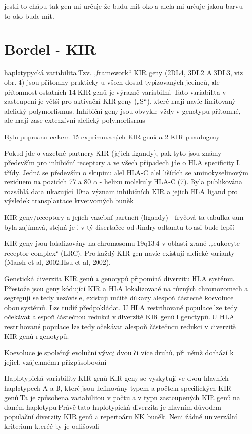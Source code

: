 \documentclass[czech,DP]{thesiskiv}
\begin{document}
jestli to chápu tak gen mi určuje že budu mít oko a alela mi určuje jakou barvu to oko bude mít.

\section{Bordel - KIR}

haplotypycká variabilita
Tzv. „framework“ KIR geny (2DL4, 3DL2 A 3DL3, viz obr. 4)
jsou přítomny prakticky u všech dosud typizovaných jedinců, ale přítomnost ostatních 14 KIR
genů je výrazně variabilní. Tato variabilita v zastoupení je větší pro aktivační KIR geny („S“),
které mají navíc limitovaný alelický polymorfismus. Inhibiční geny jsou obvykle vždy
v genotypu přítomné, ale mají zase extenzívní alelický polymorfismus

Bylo poprsáno celkem 15 exprimovaných KIR genů a 2 KIR pseudogeny


Pokud jde o vazebné partnery KIR (jejich ligandy), pak tyto jsou
známy především pro inhibiční receptory a ve všech případech jde o
HLA specificity I. třídy. Jedná se především o skupinu alel HLA-C alel
lišících se aminokyselinovým 
reziduem na pozicích
 77 a 80 $\alpha$
- helixu molekuly HLA-C (7). Byla publikována rozsáhlá data ukazující
10na význam inhibičních KIR a jejich HLA ligand pro výsledek
transplantace krvetvorných buněk

KIR geny/receptory a jejich vazební partneři (ligandy)
- fryčová ta tabulka tam byla zajímavá, stejná je i v tý disertačce od Jindry odtamtu to asi bude lepší


KIR geny jsou lokalizovány na chromosomu 19q13.4 v oblasti zvané „leukocyte receptor
complex“ (LRC). Pro každý KIR gen navíc existují alelické varianty (Marsh et al, 2002;Hsu
et al, 2002).

Genetická diverzita KIR genů a genotypů připomíná diverzitu HLA
systému. Přestože jsou geny kódující KIR a HLA lokalizované na
různých chromozomech a segregují se tedy nezávisle, existují určité
důkazy alespoň částečné koevoluce obou systémů. Lze tudíž
předpokládat. U HLA restrihované populace lze tedy očekávat
alespoň částečnou redukci v diverzitě KIR genů i genotypů.
U HLA restrihované populace lze tedy očekávat
alespoň částečnou redukci v diverzitě KIR genů i genotypů.

Koevoluce je společný evoluční vývoj dvou či více druhů, při němž dochází k jejich vzájemnému přizpůsobování

Haplotypická variability KIR genů
KIR geny se vyskytují ve dvou hlavních haplotypech A a B, které jsou definovány typem a počtem specifických KIR genů.Ta je způsobena variabilitou v počtu a v typu
zastoupených KIR genů na daném haplotypu
Právě tato
haplotypická diverzita je hlavním důvodem populační diverzity KIR
genů a repertoáru NK buněk.
Neni žádné univerzální kriterium kteréé by je odlišovali
\end{document}
